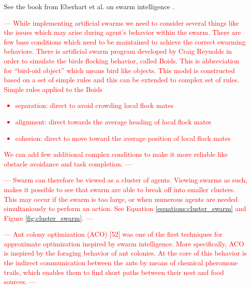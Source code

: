 See the book from Eberhart et al. on swarm intelligence \cite{eberhart2001swarm}.


\textcolor{red}{---
While implementing artificial swarms we need to consider several things like the issues which may arise during agent’s behavior within the swarm. 
There are few base conditions which need to be maintained to achieve the correct swarming behaviors.
There is artificial swarm program developed by Craig Reynolds \cite{reynolds1987flocks} in order to simulate the birds flocking behavior, called Boids. 
This is abbreviation for “bird-oid object” which means bird like objects.
This model is constructed based on a set of simple rules and this can be extended to complex set
of rules. 
Simple rules applied to the Boids
\begin{itemize}
    \item separation: direct to avoid crowding local flock mates
    \item alignment: direct towards the average heading of local flock mates
    \item cohesion: direct to move toward the average position of local flock mates
\end{itemize}
We can add few additional complex conditions to make it more reliable like obstacle avoidance and task completion.
---}
\textcolor{red}{---
Swarm can therefore be viewed as a cluster of agents.
Viewing swarms as such, makes it possible to see that swarm are able to break off into smaller clusters.
This may occur if the swarm is too large, or when numerous agents are needed simultaniously to perform an action.
See Equation \ref{equations:cluster_swarm} and Figure \ref{fig:cluster_swarm}.
---}



\textcolor{red}{---
Ant colony optimization (ACO) [52] was one of the first techniques for approximate optimization inspired by swarm intelligence. 
More specifically, ACO is inspired by the foraging behavior of ant colonies. 
At the core of this behavior is the indirect communication between the ants by means of chemical pheromone trails, 
which enables them to find short paths between their nest and food sources. 
---}

